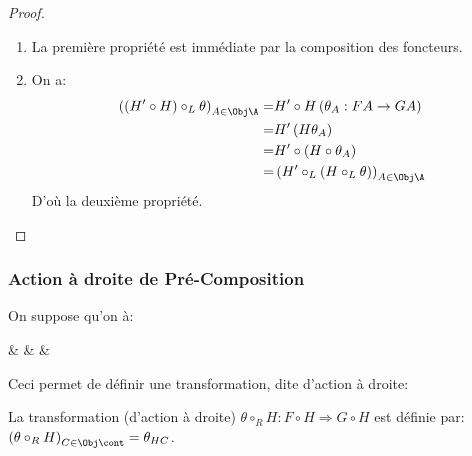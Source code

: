 \documentclass[math]{cours}
\begin{document}
\begin{proof}
	\begin{enumerate}
		\item La première propriété est immédiate par la composition des foncteurs.
		\item On a:
			\begin{equation*}
				\begin{aligned}
					\left( \left( H'\circ H \right) \circ_{L} \theta \right)_{A\in \Obj\A} =& H'\circ H\left(\theta_{A}: FA\to GA\right)\\
					=& H'\left(H\theta_{A}\right)\\
					=& H'\circ \left(H\circ \theta_{A}\right)\\
					=& \left( H'\circ_{L}\left( H \circ_{L} \theta \right) \right)_{A\in \Obj\A}
				\end{aligned}
			\end{equation*}
			D'où la deuxième propriété.
	\end{enumerate}
\end{proof}

\subsubsection{Action à droite de Pré-Composition}
On suppose qu'on à:
\begin{category}[]
	\A\arrow[r, "H"] & \B\arrow[bend left, rr, "G" name=U]\arrow[bend right, rr, "F"{swap, name=D}] & & \cont{}
\end{category}

Ceci permet de définir une transformation, dite d'action à droite:
\begin{definition}
	La transformation (d'action à droite) $\theta \circ_{R} H : F\circ H \Rightarrow G\circ H$ est définie par:
	$\left(\theta\circ_{R} H \right)_{C \in \Obj\cont} = \theta_{HC}$.
	\label{def:actiondroitetransfo}
\end{definition}
\end{document}
